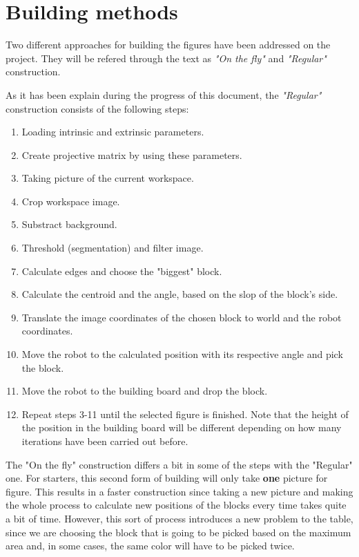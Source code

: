 \chapter{Building methods}\label{ch:building_methods}

Two different approaches for building the figures have been addressed on the project. They will be refered through the text as \textit{"On the fly"} and \textit{"Regular"} construction.

As it has been explain during the progress of this document, the \textit{"Regular"} construction consists of the following steps:
\begin{enumerate}
	\item Loading intrinsic and extrinsic parameters.
	\item Create projective matrix by using these parameters.
	\item Taking picture of the current workspace.
	\item Crop workspace image. 
	\item Substract background.
	\item Threshold (segmentation) and filter image.
	\item Calculate edges and choose the "biggest" block.
	\item Calculate the centroid and the angle, based on the slop of the block's side.
	\item Translate the image coordinates of the chosen block to world and the robot coordinates.
	\item Move the robot to the calculated position with its respective angle and pick the block.
	\item Move the robot to the building board and drop the block.
	\item Repeat steps 3-11 until the selected figure is finished. Note that the height of the position in the building board will be different depending on how many iterations have been carried out before.
\end{enumerate}

The "On the fly" construction differs a bit in some of the steps with the "Regular" one.
For starters, this second form of building will only take \textbf{one} picture for figure. This results in a faster construction since taking a new picture and making the whole process to calculate new positions of the blocks every time takes quite a bit of time.
However, this sort of process introduces a new problem to the table, since we are choosing the block that is going to be picked based on the maximum area and, in some cases, the same color will have to be picked twice.

